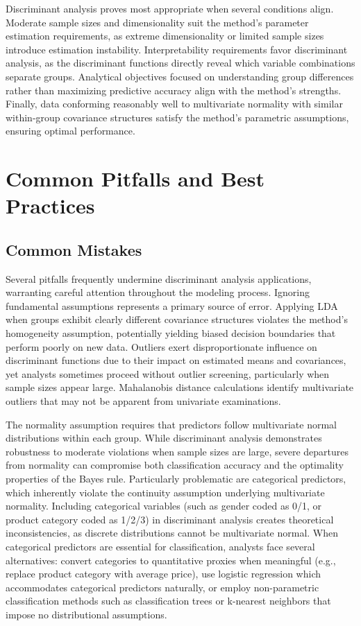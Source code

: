 \documentclass[
]{article}
\begin{document}
Discriminant analysis proves most appropriate when several conditions
align. Moderate sample sizes and dimensionality suit the method's
parameter estimation requirements, as extreme dimensionality or limited
sample sizes introduce estimation instability. Interpretability
requirements favor discriminant analysis, as the discriminant functions
directly reveal which variable combinations separate groups. Analytical
objectives focused on understanding group differences rather than
maximizing predictive accuracy align with the method's strengths.
Finally, data conforming reasonably well to multivariate normality with
similar within-group covariance structures satisfy the method's
parametric assumptions, ensuring optimal performance.

\section{Common Pitfalls and Best Practices}

\subsection{Common Mistakes}

Several pitfalls frequently undermine discriminant analysis
applications, warranting careful attention throughout the modeling
process. Ignoring fundamental assumptions represents a primary source of
error. Applying LDA when groups exhibit clearly different covariance
structures violates the method's homogeneity assumption, potentially
yielding biased decision boundaries that perform poorly on new data.
Outliers exert disproportionate influence on discriminant functions due
to their impact on estimated means and covariances, yet analysts
sometimes proceed without outlier screening, particularly when sample
sizes appear large. Mahalanobis distance calculations identify
multivariate outliers that may not be apparent from univariate
examinations.

The normality assumption requires that predictors follow multivariate
normal distributions within each group. While discriminant analysis
demonstrates robustness to moderate violations when sample sizes are
large, severe departures from normality can compromise both
classification accuracy and the optimality properties of the Bayes rule.
Particularly problematic are categorical predictors, which inherently
violate the continuity assumption underlying multivariate normality.
Including categorical variables (such as gender coded as 0/1, or product
category coded as 1/2/3) in discriminant analysis creates theoretical
inconsistencies, as discrete distributions cannot be multivariate
normal. When categorical predictors are essential for classification,
analysts face several alternatives: convert categories to quantitative
proxies when meaningful (e.g., replace product category with average
price), use logistic regression which accommodates categorical
predictors naturally, or employ non-parametric classification methods
such as classification trees or k-nearest neighbors that impose no
distributional assumptions.
\end{document}
